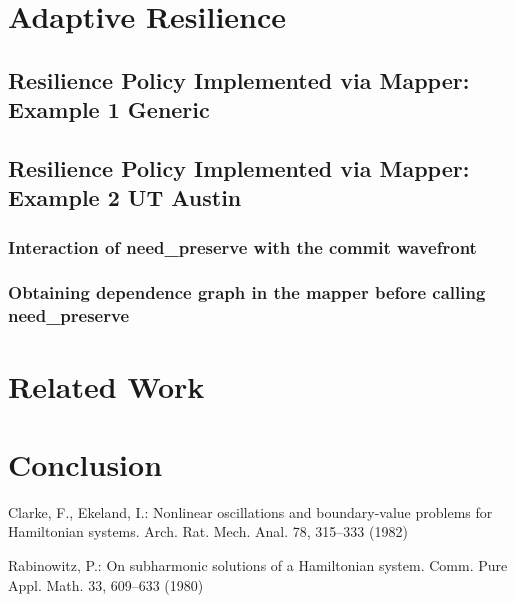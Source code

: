 \documentclass{llncs}
\begin{document}
\section{Adaptive Resilience}

\subsection{Resilience Policy Implemented via Mapper: Example 1 Generic}

\subsection{Resilience Policy Implemented via Mapper: Example 2 UT Austin}
\subsubsection{Interaction of need\_preserve with the commit wavefront}
\subsubsection{Obtaining dependence graph in the mapper before calling need\_preserve} 

\section{Related Work}

\section{Conclusion}

%
%

\begin{thebibliography}{5}
%
Clarke, F., Ekeland, I.:
Nonlinear oscillations and
boundary-value problems for Hamiltonian systems.
Arch. Rat. Mech. Anal. 78, 315--333 (1982)

Rabinowitz, P.:
On subharmonic solutions of a Hamiltonian system.
Comm. Pure Appl. Math. 33, 609--633 (1980)

\end{thebibliography}

\clearpage
%
\end{document}

